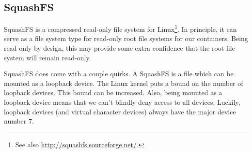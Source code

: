 \subsection{SquashFS}

SquashFS is a compressed read-only file system for Linux\footnote{See also
\url{http://squashfs.sourceforge.net/}.}. In principle, it can serve as a file
system type for read-only root file systems for our containers.  Being
read-only by design, this may provide some extra confidence that the root file
system will remain read-only.

SquashFS does come with a couple quirks. A SquashFS is a file which can be
mounted as a loopback device. The Linux kernel puts a bound on the number of
loopback devices. This bound can be increased.  Also, being mounted as a
loopback device means that we can't blindly deny access to all devices.
Luckily, loopback devices (and virtual character devices) always have the major
device number 7\cite{devices.txt-b}.
